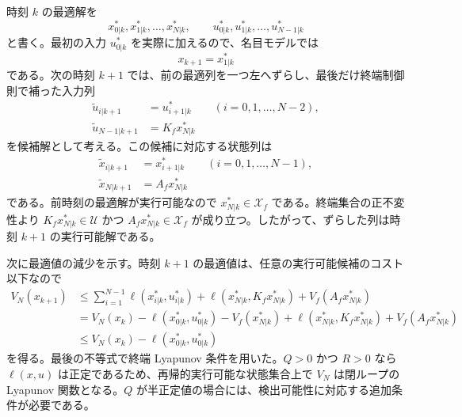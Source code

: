 \begin{derivation}
時刻 $k$ の最適解を
\begin{equation}
  x^*_{0|k},x^*_{1|k},\ldots,x^*_{N|k},
  \qquad
  u^*_{0|k},u^*_{1|k},\ldots,u^*_{N-1|k}
\end{equation}
と書く。最初の入力 $u^*_{0|k}$ を実際に加えるので、名目モデルでは
\begin{equation}
  x_{k+1}=x^*_{1|k}
\end{equation}
である。次の時刻 $k+1$ では、前の最適列を一つ左へずらし、最後だけ終端制御則で補った入力列
\begin{align}
  \tilde{u}_{i|k+1}&=u^*_{i+1|k}\qquad (i=0,1,\ldots,N-2),\\
  \tilde{u}_{N-1|k+1}&=K_fx^*_{N|k}
\end{align}
を候補解として考える。この候補に対応する状態列は
\begin{align}
  \tilde{x}_{i|k+1}&=x^*_{i+1|k}\qquad (i=0,1,\ldots,N-1),\\
  \tilde{x}_{N|k+1}&=A_fx^*_{N|k}
\end{align}
である。前時刻の最適解が実行可能なので $x^*_{N|k}\in\mathcal{X}_f$ である。終端集合の正不変性より $K_fx^*_{N|k}\in\mathcal{U}$ かつ $A_fx^*_{N|k}\in\mathcal{X}_f$ が成り立つ。したがって、ずらした列は時刻 $k+1$ の実行可能解である。

次に最適値の減少を示す。時刻 $k+1$ の最適値は、任意の実行可能候補のコスト以下なので
\begin{align}
  V_N(x_{k+1})
  &\le
  \sum_{i=1}^{N-1}\ell(x^*_{i|k},u^*_{i|k})
  +\ell(x^*_{N|k},K_fx^*_{N|k})
  +V_f(A_fx^*_{N|k})\\
  &=V_N(x_k)-\ell(x^*_{0|k},u^*_{0|k})
  -V_f(x^*_{N|k})
  +\ell(x^*_{N|k},K_fx^*_{N|k})
  +V_f(A_fx^*_{N|k})\\
  &\le V_N(x_k)-\ell(x^*_{0|k},u^*_{0|k})
\end{align}
を得る。最後の不等式で終端 Lyapunov 条件を用いた。$Q>0$ かつ $R>0$ なら $\ell(x,u)$ は正定であるため、再帰的実行可能な状態集合上で $V_N$ は閉ループの Lyapunov 関数となる。$Q$ が半正定値の場合には、検出可能性に対応する追加条件が必要である。
\end{derivation}


